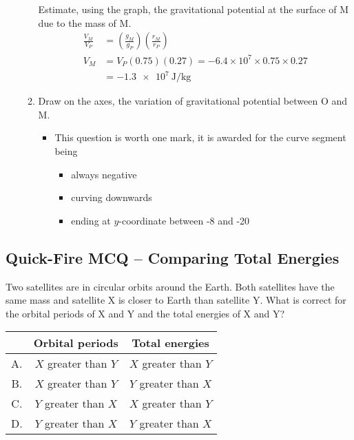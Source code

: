 \documentclass[a4paper,12pt]{article}
\begin{document}
\begin{enumerate}[label=(\alph*)]
\begin{enumerate}[label=(\roman*)]
                Estimate, using the graph, the gravitational potential at the surface of M due to the mass of M.
                \begin{align*}
                  \frac{V_M}{V_P} & = \left(\frac{g_M}{g_P}\right)\left(\frac{r_M}{r_P}\right)  \\
                  V_M             & = V_P(0.75)(0.27) = -6.4\times 10^7 \times 0.75 \times 0.27 \\
                                  & =-\SI{1.3e7}{\joule\per\kilo\g}
                \end{align*}
          \item Draw on the axes, the variation of gravitational potential between O and M.
                \begin{itemize}
                  \item This question is worth one mark, it is awarded for the curve segment being
                        \begin{itemize}
                          \item always negative
                          \item curving downwards
                          \item ending at $y$-coordinate between -8 and -20
                        \end{itemize}
                \end{itemize}
        \end{enumerate}

\end{enumerate}

\pagebreak

\subsection{Quick-Fire MCQ -- Comparing Total Energies}

Two satellites are in circular orbits around the Earth. Both satellites have the same mass and satellite X is closer to Earth than satellite Y. What is correct for the orbital periods of X and Y and the total energies of X and Y?

\begin{table}[H]
  \centering
  \begin{tabular}{|c|c|c|}
    \hline    & \textbf{Orbital periods} & \textbf{Total energies} \\
    \hline A. & $X$ greater than $Y$     & $X$ greater than $Y$    \\
    \hline B. & $X$ greater than $Y$     & $Y$ greater than $X$    \\
    \hline C. & $Y$ greater than $X$     & $X$ greater than $Y$    \\
    \hline D. & $Y$ greater than $X$     & $Y$ greater than $X$    \\
    \hline
  \end{tabular}
\end{table}
\end{document}
